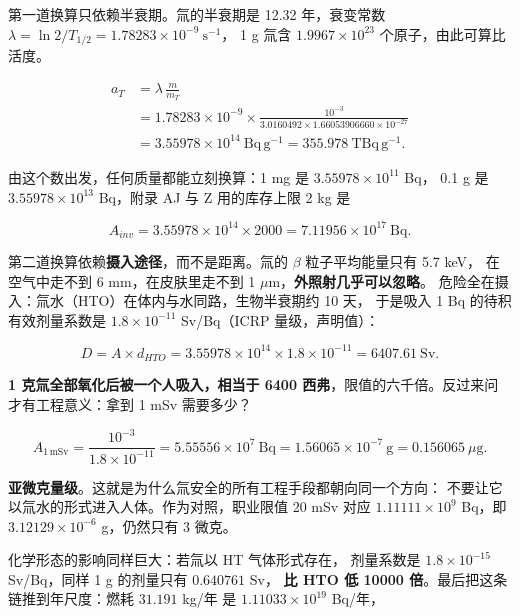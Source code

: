 第一道换算只依赖半衰期。氚的半衰期是 12.32 年，衰变常数
$\lambda=\ln 2/T_{1/2}=1.78283\times10^{-9}\ \mathrm{s^{-1}}$，
1 g 氚含 $1.9967\times10^{23}$ 个原子，由此可算比活度。

\begin{equation}
\begin{aligned}
a_T&=\lambda\,\frac{m}{m_T}\\
&=1.78283\times10^{-9}\times\frac{10^{-3}}{3.0160492\times1.66053906660\times10^{-27}}\\
&=3.55978\times10^{14}\ \mathrm{Bq\,g^{-1}}=355.978\ \mathrm{TBq\,g^{-1}}.
\end{aligned}
\label{eq:app-ak-activity}
\end{equation}

由这个数出发，任何质量都能立刻换算：1 mg 是 $3.55978\times10^{11}$ Bq，
0.1 g 是 $3.55978\times10^{13}$ Bq，附录 AJ 与 Z 用的库存上限 2 kg 是

\begin{equation}
A_{inv}=3.55978\times10^{14}\times2000=7.11956\times10^{17}\ \mathrm{Bq}.
\label{eq:app-ak-inventory}
\end{equation}

第二道换算依赖\textbf{摄入途径}，而不是距离。氚的 $\beta$ 粒子平均能量只有 5.7 keV，
在空气中走不到 6 mm，在皮肤里走不到 1 $\mu$m，\textbf{外照射几乎可以忽略}。
危险全在摄入：氚水（HTO）在体内与水同路，生物半衰期约 10 天，
于是吸入 1 Bq 的待积有效剂量系数是 $1.8\times10^{-11}$ Sv/Bq（ICRP 量级，声明值）：

\begin{equation}
D=A\times d_{HTO}=3.55978\times10^{14}\times1.8\times10^{-11}
=6407.61\ \mathrm{Sv}.
\label{eq:app-ak-dose}
\end{equation}

\textbf{1 克氚全部氧化后被一个人吸入，相当于 6400 西弗}，限值的六千倍。反过来问才有工程意义：拿到 1 mSv 需要多少？

\begin{equation}
A_{1\,\mathrm{mSv}}=\frac{10^{-3}}{1.8\times10^{-11}}
=5.55556\times10^{7}\ \mathrm{Bq}=1.56065\times10^{-7}\ \mathrm{g}=0.156065\ \mu\mathrm{g}.
\label{eq:app-ak-limit}
\end{equation}

\textbf{亚微克量级}。这就是为什么氚安全的所有工程手段都朝向同一个方向：
不要让它以氚水的形式进入人体。作为对照，职业限值 20 mSv 对应
$1.11111\times10^{9}$ Bq，即 $3.12129\times10^{-6}$ g，仍然只有 3 微克。

化学形态的影响同样巨大：若氚以 HT 气体形式存在，
剂量系数是 $1.8\times10^{-15}$ Sv/Bq，同样 1 g 的剂量只有 $0.640761$ Sv，
\textbf{比 HTO 低 10000 倍}。最后把这条链推到年尺度：燃耗 $31.191$ kg/年
是 $1.11033\times10^{19}$ Bq/年，

